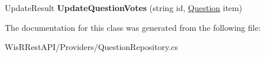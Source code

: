 \begin{DoxyCompactItemize}
\item 
\hypertarget{class_wis_r_rest_a_p_i_1_1_domain_model_1_1_question_repository_a3fa7bef09fe7020a67506578976b06d8}{}Update\+Result {\bfseries Update\+Question\+Votes} (string id, \hyperlink{class_wis_r_1_1_domain_models_1_1_question}{Question} item)\label{class_wis_r_rest_a_p_i_1_1_domain_model_1_1_question_repository_a3fa7bef09fe7020a67506578976b06d8}

\end{DoxyCompactItemize}


The documentation for this class was generated from the following file\+:\begin{DoxyCompactItemize}
\item 
Wis\+R\+Rest\+A\+P\+I/\+Providers/Question\+Repository.\+cs\end{DoxyCompactItemize}
